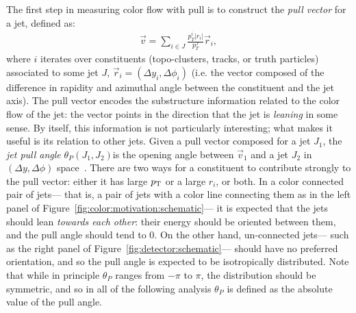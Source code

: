 The first step in measuring color flow with pull is to construct the \textit{pull vector} for a jet, defined as:
%
\begin{align}
\label{eqn:pull}
\vec{v} = \sum_{i\in J} \frac{p_T^i |r_i|}{p_T^{J}}\vec{r}_i,
\end{align}
%
where $i$ iterates over constituents (topo-clusters, tracks, or truth particles) associated to some jet $J$, $\vec{r}_i = (\Delta y_i,\Delta\phi_i)$ (i.e. the vector composed of the difference in rapidity and azimuthal angle between the constituent and the jet axis). The pull vector encodes the substructure information related to the color flow of the jet: the vector points in the direction that the jet is \textit{leaning} in some sense. By itself, this information is not particularly interesting; what makes it useful is its relation to other jets. Given a pull vector composed for a jet $J_1$, the \textit{jet pull angle} $\theta_P(J_1, J_2)$is the opening angle between $\vec{v}_1$ and a jet $J_2$ in $(\Delta y,\Delta\phi)$ space~\cite{Gallicchio:2010sw}. There are two ways for a constituent to contribute strongly to the pull vector: either it has large $p_{\text{T}}$ or a large $r_i$, or both. In a color connected pair of jets--- that is, a pair of jets with a color line connecting them as in the left panel of Figure~\ref{fig:color:motivation:schematic}--- it is expected that the jets should lean \textit{towards each other}: their energy should be oriented between them, and the pull angle should tend to 0. On the other hand, un-connected jets--- such as the right panel of Figure~\ref{fig:detector:schematic}--- should have no preferred orientation, and so the pull angle is expected to be isotropically distributed. Note that while in principle $\theta_P$ ranges from $-\pi$ to $\pi$, the distribution should  be symmetric, and so in all of the following analysis $\theta_P$ is defined as the absolute value of the pull angle.





